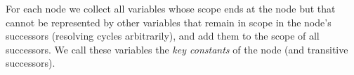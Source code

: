 For each node we collect all variables whose scope ends at the node but that cannot be represented by other variables that remain in scope in the node's successors (resolving cycles arbitrarily), and add them to the scope of all successors. We call these variables the \emph{key constants} of the node (and transitive successors).



